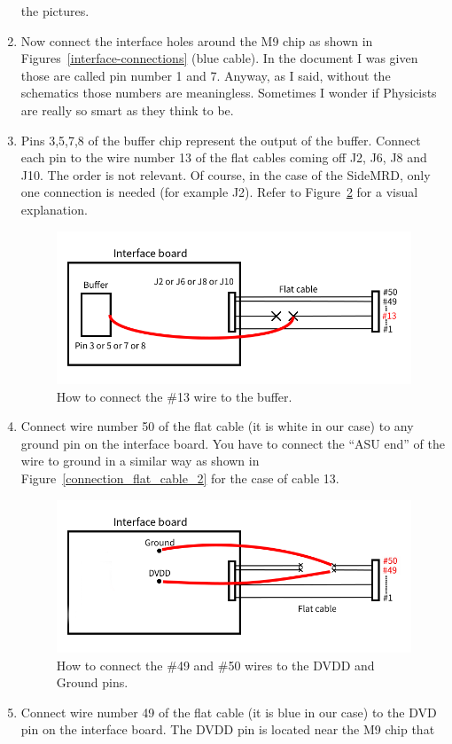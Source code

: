 \begin{enumerate}
  the pictures.
\item Now connect the interface holes around the M9 chip as shown in
  Figures~\ref{interface-connections} (blue cable). In the document I was given
  those are called pin number 1 and 7. Anyway, as I said, without the schematics
  those numbers are meaningless. Sometimes I wonder if Physicists are really so
  smart as they think to be.
\item Pins 3,5,7,8 of the buffer chip represent the output of the
  buffer. Connect each pin to the wire number 13 of the flat cables coming off
  J2, J6, J8 and J10. The order is not relevant. Of course, in the case of the
  SideMRD, only one connection is needed (for example J2). Refer to
  Figure~\ref{connection_flat_cable_1} for a visual explanation.
  \begin{figure}[H]
    \centering \includegraphics[width=0.6\linewidth]{connection_flat_cable_1}
    \caption{How to connect the \#13 wire to the buffer.}%
    \label{connection_flat_cable_1}
  \end{figure}
\item Connect wire number 50 of the flat cable (it is white in our case) to any
  ground pin on the interface board. You have to connect the ``ASU end'' of the
  wire to ground in a similar way as shown in Figure~\ref{connection_flat_cable_2}
  for the case of cable 13.
    \begin{figure}[H]
    \centering \includegraphics[width=0.6\linewidth]{connection_flat_cable_2}
    \caption{How to connect the \#49 and \#50 wires to the DVDD and Ground pins.}%
    \label{connection_flat_cable_1}
  \end{figure}
\item Connect wire number 49 of the flat cable (it is blue in our case) to the
  DVD pin on the interface board. The DVDD pin is located near the M9 chip that

\end{enumerate}
